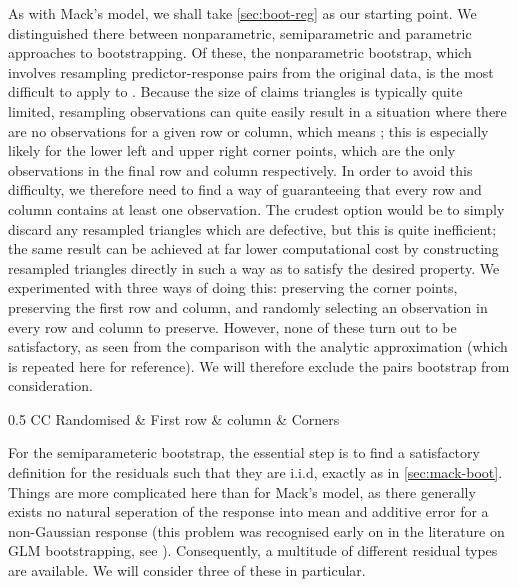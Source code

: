 \documentclass[a4paper]{book}
\begin{document}
As with Mack's model, we shall take \cref{sec:boot-reg} as our starting point. We distinguished there between nonparametric, semiparametric and parametric approaches to bootstrapping. Of these, the nonparametric bootstrap, which involves resampling predictor-response pairs from the original data, is the most difficult to apply to . Because the size of claims triangles is typically quite limited, resampling observations can quite easily result in a situation where there are no observations for a given row or column, which means ; this is especially likely for the lower left and upper right corner points, which are the only observations in the final row and column respectively. In order to avoid this difficulty, we therefore need to find a way of guaranteeing that every row and column contains at least one observation. The crudest option would be to simply discard any resampled triangles which are defective, but this is quite inefficient; the same result can be achieved at far lower computational cost by constructing resampled triangles directly in such a way as to satisfy the desired property. We experimented with three ways of doing this: preserving the corner points, preserving the first row and column, and randomly selecting an observation in every row and column to preserve. However, none of these turn out to be satisfactory, as seen from the comparison with the analytic approximation (which is repeated here for reference). We will therefore exclude the pairs bootstrap from consideration.

\begin{table}
  \centering
  \begin{tabularx}{0.5 \linewidth}{CC \mcol{3em} \mcol{3em} \mcol{4em}}\toprule
    Randomised & First row \& column & Corners \\ \midrule
     \bottomrule
  \end{tabularx}
  \caption{Results for semiparameteric bootstrap with deviance residuals}
  \label{tab:semiparam-pois-dev-res}
\end{table}


For the semiparameteric bootstrap, the essential step is to find a satisfactory definition for the residuals such that they are i.i.d, exactly as in \cref{sec:mack-boot}. Things are more complicated here than for Mack's model, as there generally exists no natural seperation of the response into mean and additive error for a non-Gaussian response (this problem was recognised early on in the literature on GLM bootstrapping, see \cite{moulton}). Consequently, a multitude of different residual types are available. We will consider three of these in particular.
\end{document}
